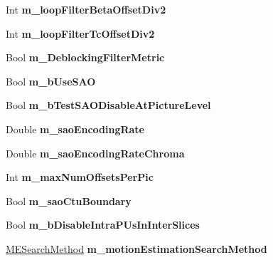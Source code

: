 \begin{DoxyCompactItemize}
Int {\bfseries m\+\_\+loop\+Filter\+Beta\+Offset\+Div2}
\item 
\mbox{\label{class_t_enc_cfg_ae65aeedb1cdfa238016657f4e007ac43}} 
Int {\bfseries m\+\_\+loop\+Filter\+Tc\+Offset\+Div2}
\item 
\mbox{\label{class_t_enc_cfg_a0736ac8a61ea0ba80cec192f494caefe}} 
Bool {\bfseries m\+\_\+\+Deblocking\+Filter\+Metric}
\item 
\mbox{\label{class_t_enc_cfg_a0ea190bd058a87209134550b23713059}} 
Bool {\bfseries m\+\_\+b\+Use\+S\+AO}
\item 
\mbox{\label{class_t_enc_cfg_a698337a57586127939de3ae127015f86}} 
Bool {\bfseries m\+\_\+b\+Test\+S\+A\+O\+Disable\+At\+Picture\+Level}
\item 
\mbox{\label{class_t_enc_cfg_a4eeca7913c36082a2fe3695304666a0d}} 
Double {\bfseries m\+\_\+sao\+Encoding\+Rate}
\item 
\mbox{\label{class_t_enc_cfg_a5996391c054230ba38e145eff6226abb}} 
Double {\bfseries m\+\_\+sao\+Encoding\+Rate\+Chroma}
\item 
\mbox{\label{class_t_enc_cfg_a0cbd080408e70a42792eb994070e5e4b}} 
Int {\bfseries m\+\_\+max\+Num\+Offsets\+Per\+Pic}
\item 
\mbox{\label{class_t_enc_cfg_ab23f85d5084e3a45b3ca733ea49b3cd8}} 
Bool {\bfseries m\+\_\+sao\+Ctu\+Boundary}
\item 
\mbox{\label{class_t_enc_cfg_a5f747125e3c28c3cc91abfb4e1d2aed9}} 
Bool {\bfseries m\+\_\+b\+Disable\+Intra\+P\+Us\+In\+Inter\+Slices}
\item 
\mbox{\label{class_t_enc_cfg_a825ef279e60c4d46828b41e85fceb4ab}} 
\hyperlink{_type_def_8h_a8aca966885e6dbeca4cabfc3530a9bde}{M\+E\+Search\+Method} {\bfseries m\+\_\+motion\+Estimation\+Search\+Method}
\item 
\mbox{\label{class_t_enc_cfg_a1e8f7d40e942b1a8b6168cdebc1fc954}} 

\end{DoxyCompactItemize}
